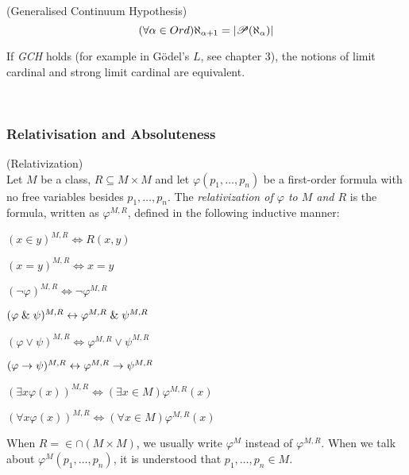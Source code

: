 \begin{definition}{(Generalised Continuum Hypothesis)}\label{def:gch}\\
\begin{equation}
(\forall \alpha \in Ord) \aleph_{\alpha+1}=|\mathscr{P} (\aleph_\alpha)|
\end{equation}
\end{definition}
If \emph{GCH} holds (for example in Gödel's $L$, see chapter 3), the notions of limit cardinal and strong limit cardinal are equivalent.

\

\subsubsection{Relativisation and Absoluteness} %
\begin{definition}{(Relativization)}\label{def:relativization}\\
Let $M$ be a class, $R \subseteq M\times M$ and let $\varphi(p_1, \ldots, p_n)$ be a first-order formula with no free variables besides $p_1, \ldots, p_n$. 
The \emph{relativization of $\varphi$ to $M$ and $R$} is the formula, written as $\varphi^{M, R}$, defined in the following inductive manner:
\bce[(i)]
\item $(x \in y)^{M,R} \iff R(x, y)$
\item $(x = y)^{M,R} \iff x = y$
\item $(\neg \varphi)^{M,R} \iff \neg \varphi^{M,R}$
\item $(\varphi \mathrel{\&} \psi)^{M,R} \leftrightarrow \varphi^{M,R} \mathrel{\&} \psi^{M,R}$
\item $(\varphi \lor \psi)^{M,R} \iff \varphi^{M,R} \lor \psi^{M,R}$
\item $(\varphi \rightarrow \psi)^{M,R} \leftrightarrow \varphi^{M,R} \rightarrow \psi^{M,R}$
\item $(\exists x \varphi(x))^{M,R} \iff (\exists x \in M) \varphi^{M,R}(x)$
\item $(\forall x \varphi(x))^{M,R} \iff (\forall x \in M) \varphi^{M,R}(x)$
\ece
\end{definition}
When $R=\in\cap(M \times M)$, we usually write $\varphi^M$ instead of $\varphi^{M, R}$. When we talk about $\varphi^M(p_1, \ldots, p_n)$, it is understood that $p_1, \ldots, p_n \in M$.


